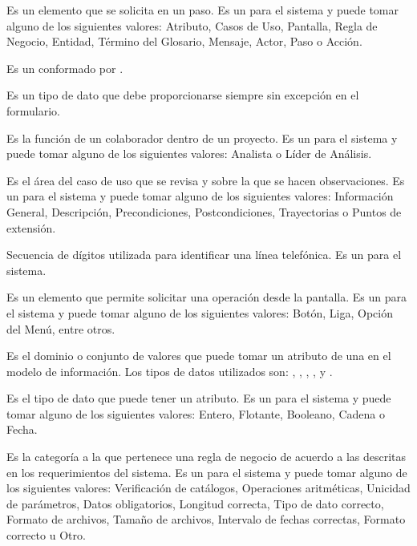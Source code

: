 \begin{description}
	 Es un elemento que se solicita en un paso. Es un  para el sistema y puede tomar alguno de los siguientes valores:
	Atributo, Casos de Uso, Pantalla, Regla de Negocio, Entidad, Término del Glosario, Mensaje, Actor, Paso o Acción.
	
	 Es un   conformado por .

	 Es un tipo de dato que debe proporcionarse siempre sin excepción en el formulario.
	
	 Es la función de un colaborador dentro de un proyecto. Es un  para el sistema y puede tomar alguno de los siguientes valores:
	Analista o Líder de Análisis.
	
	 Es el área del caso de uso que se revisa y sobre la que se hacen observaciones. Es un  para el sistema y puede tomar alguno de los siguientes valores:
	Información General, Descripción, Precondiciones, Postcondiciones, Trayectorias o Puntos de extensión.
	
	 Secuencia de dígitos utilizada para identificar una línea telefónica. Es un  para el sistema.
	
	 Es un elemento que permite solicitar una operación desde la pantalla. Es un  para el sistema y puede tomar alguno de los siguientes valores:
	Botón, Liga, Opción del Menú, entre otros.
	
	 Es el dominio o conjunto de valores que puede tomar un atributo de una  en el modelo de información. Los tipos de datos 
	utilizados son: , , , ,  y 
	.
	
	 Es el tipo de dato que puede tener un atributo. Es un  para el sistema y puede tomar alguno de los siguientes valores:
	Entero, Flotante, Booleano, Cadena o Fecha.
	
	 Es la categoría a la que pertenece una regla de negocio de acuerdo a las descritas en los requerimientos del sistema.
	Es un  para el sistema y puede tomar alguno de los siguientes valores:
	Verificación de catálogos, Operaciones aritméticas, Unicidad de parámetros, Datos obligatorios, Longitud correcta, Tipo de dato correcto, Formato de archivos, 
	Tamaño de archivos, Intervalo de fechas correctas, Formato correcto u Otro.
	
\end{description}
